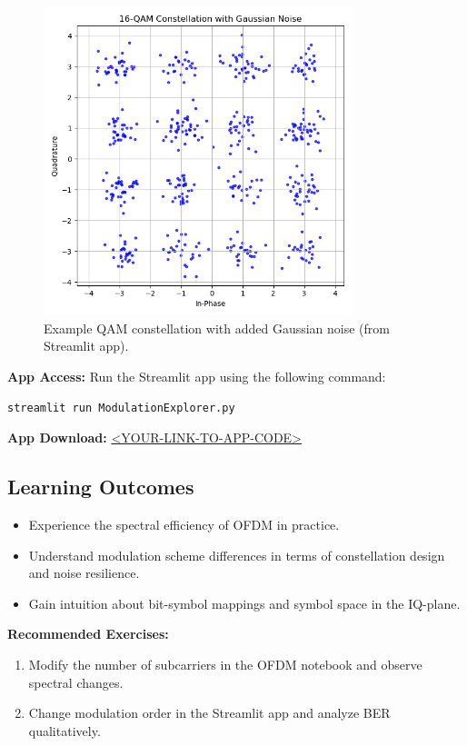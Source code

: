 \begin{figure}[h!]
  \centering
  \includegraphics[width=0.8\textwidth]{figures/modulation_constellation_example.png}
  \caption{Example QAM constellation with added Gaussian noise (from Streamlit app).}
  \label{fig:modulation-app}
\end{figure}

\textbf{App Access:}  
Run the Streamlit app using the following command:
\begin{verbatim}
streamlit run ModulationExplorer.py
\end{verbatim}

\textbf{App Download:}  
\url{<YOUR-LINK-TO-APP-CODE>}

\subsection{Learning Outcomes}

\begin{itemize}
  \item Experience the spectral efficiency of OFDM in practice.
  \item Understand modulation scheme differences in terms of constellation design and noise resilience.
  \item Gain intuition about bit-symbol mappings and symbol space in the IQ-plane.
\end{itemize}

\textbf{Recommended Exercises:}
\begin{enumerate}
  \item Modify the number of subcarriers in the OFDM notebook and observe spectral changes.
  \item Change modulation order in the Streamlit app and analyze BER qualitatively.
\end{enumerate}
